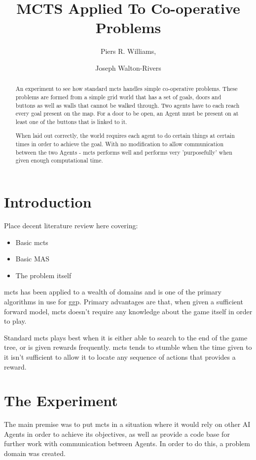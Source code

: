\documentclass{IEEEtran}
\author{Piers R. Williams, \and Joseph Walton-Rivers}
\title{MCTS Applied To Co-operative Problems}
\begin{document}
\maketitle
\begin{abstract}
An experiment to see how standard \gls{mcts} handles simple co-operative problems.	These problems are formed from a simple grid world that has a set of goals, doors and buttons as well as walls that cannot be walked through. Two agents have to each reach every goal present on the map. For a door to be open, an Agent must be present on at least one of the buttons that is linked to it.

When laid out correctly, the world requires each agent to do certain things at certain times in order to achieve the goal. With no modification to allow communication between the two Agents - \gls{mcts} performs well and performs very 'purposefully' when given enough computational time.
\end{abstract}

\section{Introduction}
Place decent literature review here covering:
\begin{itemize}
\item{Basic \gls{mcts}}
\item{Basic MAS}
\item{The problem itself}
\end{itemize}

\gls{mcts} has been applied to a wealth of domains and is one of the primary algorithms in use for \gls{ggp}. Primary advantages are that, when given a sufficient forward model, \gls{mcts} doesn't require any knowledge about the game itself in order to play.

Standard \gls{mcts} plays best when it is either able to search to the end of the game tree, or is given rewards frequently. \gls{mcts} tends to stumble when the time given to it isn't sufficient to allow it to locate any sequence of actions that provides a reward.

\section{The Experiment}
The main premise was to put \gls{mcts} in a situation where it would rely on other AI Agents in order to achieve its objectives, as well as provide a code base for further work with communication between Agents. In order to do this, a problem domain was created.
\end{document}
